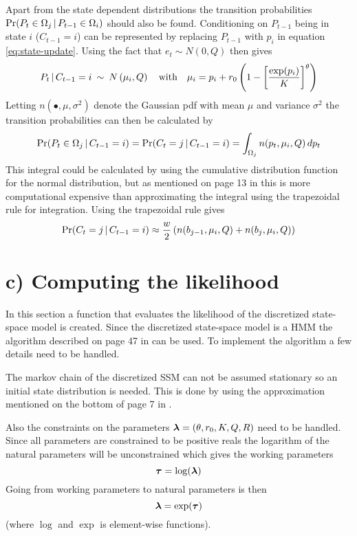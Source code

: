 Apart from the state dependent distributions the transition probabilities $\Pr(P_t\in\Omega_j\,|\, P_{t-1}\in\Omega_i)$ should also be found. Conditioning on $P_{t-1}$ being in state $i$ ($C_{t-1}=i$) can be represented by replacing $P_{t-1}$ with $p_i$ in equation \ref{eq:state-update}. Using the fact that $e_t\sim N(0,Q)$ then gives 
\begin{equation*}
    P_t \,|\, C_{t-1}=i \:\sim\: N\left(\mu_i, Q\right) \quad\text{with}\quad \mu_i = p_i + r_0\left(1-\left[\frac{\exp(p_i)}{K}\right]^\theta\right)
\end{equation*}
%
Letting $n(\bullet, \mu, \sigma^2)$ denote the Gaussian pdf with mean $\mu$ and variance $\sigma^2$ the transition probabilities can then be calculated by
%
\begin{equation*}
    \Pr(P_t\in\Omega_j\,|\, C_{t-1}=i) = \Pr(C_t=j\,|\, C_{t-1}=i) = \int_{\Omega_j} n(p_t, \mu_i, Q)\, dp_t
\end{equation*}
%
This integral could be calculated by using the cumulative distribution function for the normal distribution, but as mentioned on page 13 in \citep{waever11} this is more computational expensive than approximating the integral using the trapezoidal rule for integration. Using the trapezoidal rule gives
%
\begin{equation*}
    \Pr(C_t = j\,|\, C_{t-1}=i) \approx \frac{w}{2}\left(n(b_{j-1}, \mu_i, Q) + n(b_j, \mu_i, Q)\right)
\end{equation*}


\section*{c) Computing the likelihood}

In this section a function that evaluates the likelihood of the discretized state-space model is created. Since the discretized state-space model is a HMM the algorithm described on page 47 in \citep{zucchini09} can be used. To implement the algorithm a few details need to be handled.

The markov chain of the discretized SSM can not be assumed stationary so an initial state distribution is needed. This is done by using the approximation mentioned on the bottom of page 7 in \citep{waever11}.

Also the constraints on the parameters $\boldsymbol{\lambda}=(\theta, r_0, K, Q, R)$ need to be handled. Since all parameters are constrained to be positive reals the logarithm of the natural parameters will be unconstrained which gives the working parameters
\begin{equation*}
    \boldsymbol{\tau} = \log(\boldsymbol{\lambda})
\end{equation*}
Going from working parameters to natural parameters is then
\begin{equation*}
    \boldsymbol{\lambda} = \exp(\boldsymbol{\tau})
\end{equation*}
(where $\log$ and $\exp$ is element-wise functions).

